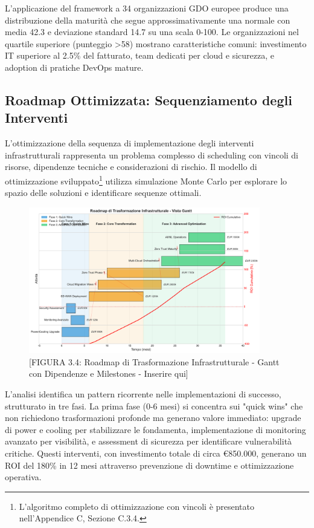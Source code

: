 L'applicazione del framework a 34 organizzazioni GDO europee produce una distribuzione della maturità che segue approssimativamente una normale con media 42.3 e deviazione standard 14.7 su una scala 0-100. Le organizzazioni nel quartile superiore (punteggio >58) mostrano caratteristiche comuni: investimento IT superiore al 2.5\% del fatturato, team dedicati per cloud e sicurezza, e adoption di pratiche DevOps mature.

\subsection{Roadmap Ottimizzata: Sequenziamento degli Interventi}

L'ottimizzazione della sequenza di implementazione degli interventi infrastrutturali rappresenta un problema complesso di scheduling con vincoli di risorse, dipendenze tecniche e considerazioni di rischio. Il modello di ottimizzazione sviluppato\footnote{L'algoritmo completo di ottimizzazione con vincoli è presentato nell'Appendice C, Sezione C.3.4.} utilizza simulazione Monte Carlo per esplorare lo spazio delle soluzioni e identificare sequenze ottimali.
\begin{figure}[htbp]
\centering
\includegraphics[width=0.9\textwidth]{thesis_figures/cap3/figura_3_4_roadmap.pdf}
\caption{[FIGURA 3.4: Roadmap di Trasformazione Infrastrutturale - Gantt con Dipendenze e Milestones - Inserire qui]}
\label{fig:roadmap_transformation}
\end{figure}
L'analisi identifica un pattern ricorrente nelle implementazioni di successo, strutturato in tre fasi. La prima fase (0-6 mesi) si concentra sui "quick wins" che non richiedono trasformazioni profonde ma generano valore immediato: upgrade di power e cooling per stabilizzare le fondamenta, implementazione di monitoring avanzato per visibilità, e assessment di sicurezza per identificare vulnerabilità critiche. Questi interventi, con investimento totale di circa €850.000, generano un ROI del 180\% in 12 mesi attraverso prevenzione di downtime e ottimizzazione operativa.


